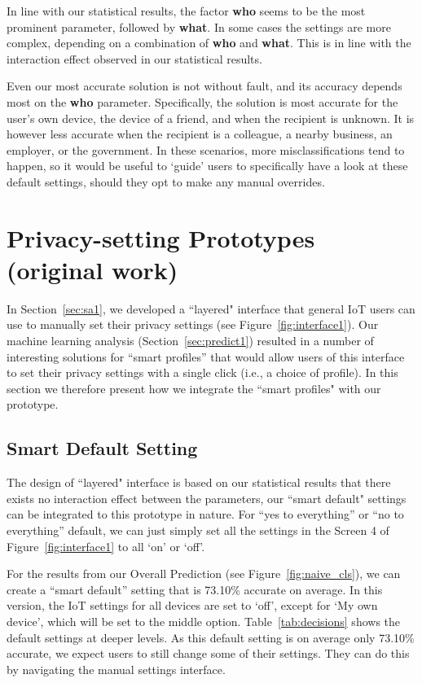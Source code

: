 In line with our statistical results, the factor \textbf{who} seems to be the most prominent parameter, followed by \textbf{what}. In some cases the settings are more complex, depending on a combination of \textbf{who} and \textbf{what}. This is in line with the interaction effect observed in our statistical results.

Even our most accurate solution is not without fault, and its accuracy depends most on the \textbf{who} parameter. Specifically, the solution is most accurate for the user's own device, the device of a friend, and when the recipient is unknown. It is however less accurate when the recipient is a colleague, a nearby business, an employer, or the government. In these scenarios, more misclassifications tend to happen, so it would be useful to `guide' users to specifically have a look at these default settings, should they opt to make any manual overrides.

\section{Privacy-setting Prototypes (original work)}\label{sec:design1}
In Section~\ref{sec:sa1}, we developed a ``layered" interface that general IoT users can use to manually set their privacy settings (see Figure~\ref{fig:interface1}). Our machine learning analysis (Section~\ref{sec:predict1}) resulted in a number of interesting solutions for ``smart profiles'' that would allow users of this interface to set their privacy settings with a single click (i.e., a choice of profile). In this section we therefore present how we integrate the ``smart profiles" with our prototype. 

\subsection{Smart Default Setting}
The design of ``layered" interface is based on our statistical results that there exists no interaction effect between the parameters, our ``smart default" settings can be integrated to this prototype in nature. For ``yes to everything'' or ``no to everything'' default, we can just simply set all the settings in the Screen 4 of Figure~\ref{fig:interface1} to all `on' or `off'.

For the results from our Overall Prediction (see Figure~\ref{fig:naive_cls}), we can create a ``smart default'' setting that is 73.10\% accurate on average. In this version, the IoT settings for all devices are set to `off', except for `My own device', which will be set to the middle option. Table~\ref{tab:decisions} shows the default settings at deeper levels.
As this default setting is on average only 73.10\% accurate, we expect users to still change some of their settings. They can do this by navigating the manual settings interface.

